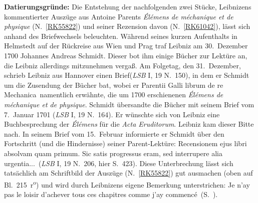 %  
%
%
%   
%
%
%
\frenchspacing
%
\vspace{5mm}
\begin{ledgroup}
\footnotesize
\pstart
\noindent%
\textbf{Datierungsgründe:}
Die Entstehung der nachfolgenden zwei Stücke, Leibnizens kommentierter Auszüge aus 
\protect{}Antoine Parents 
\cite{01500}\textit{Élémens de méchanique et de physique} (N.~\ref{RK55822}) und seiner Rezension davon (N.~\ref{RK61042}), lässt sich anhand des Briefwechsels beleuchten.%
\pend
%
\pstart
Während seines kurzen Aufenthalts in \protect{}Helmstedt 
auf der Rückreise aus Wien\protect{}
und \protect{}Prag
traf Leibniz am 30.\ Dezember 1700
\protect{}Johannes Andreas Schmidt.
Dieser bot ihm einige Bücher zur Lektüre an, die Leibniz allerdings mitzunehmen vergaß.
%
Am Folgetag, den 31.\ Dezember, schrieb Leibniz aus \protect{}Hannover
einen Brief\cite{02056}(\textit{LSB} I, 19 N.~150), in dem er 
\protect{}Schmidt um die Zusendung der Bücher bat, 
wobei er \glqq Parentii Galli librum de re Mechanica\grqq\ namentlich erwähnte,
die um 1700 erschienenen
\cite{01500}\textit{Élémens de méchanique et de physique}.
%
\protect{}Schmidt übersandte die Bücher mit seinem Brief vom 7.\ Januar 1701 
(\cite{02057}\textit{LSB} I, 19 N.~164).
%
Er wünschte sich von Leibniz eine Buchbesprechung der \cite{01500}\textit{Élémens} für die
\cite{01023}\textit{Acta Eruditorum}.
%
Leibniz kam dieser Bitte nach.
%
In seinem Brief vom 15.\ Februar informierte er 
%
\protect{}Schmidt über den Fortschritt (und die Hindernisse) seiner Parent-Lektüre:
%
\glqq Recensionem ejus libri absolvam quam primum. Sic satis progressus eram, sed interrupere alia urgentia...\grqq\ 
(\textit{LSB} I, 19 N.~206, hier S.~423).
%
Diese Unterbrechung lässt sich tatsächlich am Schriftbild der Auszüge (N.~\ref{RK55822}) gut ausmachen (oben auf Bl.~215~r\textsuperscript{o}) und wird durch Leibnizens eigene Bemerkung unterstrichen: \glqq Je n'ay pas le loisir d'achever tous ces chapitres comme j'ay commencé\grqq\ (S.~). 

\end{ledgroup}
